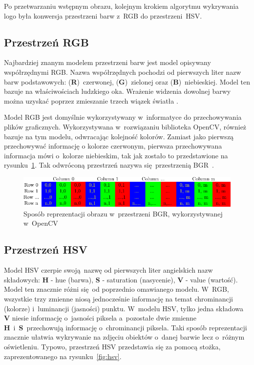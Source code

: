 Po przetwarzaniu wstępnym obrazu, kolejnym krokiem algorytmu wykrywania logo \bk była konwersja przestrzeni barw z~RGB do przestrzeni~HSV.

\subsection{Przestrzeń RGB}
Najbardziej znanym modelem przestrzeni barw jest model opisywany współrzędnymi RGB. Nazwa współrzędnych pochodzi od pierwszych liter nazw barw podstawowych: (\textbf{R})~czerwonej, (\textbf{G})~zielonej oraz (\textbf{B})~niebieskiej. Model ten bazuje na właściwościach ludzkiego oka. Wrażenie widzenia dowolnej barwy można uzyskać poprzez zmieszanie trzech wiązek światła \cite{jankowski1990elementy}.

Model RGB jest domyślnie wykorzystywany w~informatyce do przechowywania plików graficznych. Wykorzystywana w~rozwiązaniu biblioteka OpenCV, również bazuje na tym modelu, odwracając kolejność kolorów. Zamiast jako pierwszą przechowywać informację o kolorze czerwonym, pierwsza przechowywana informacja mówi o~kolorze niebieskim, tak jak zostało to przedstawione na rysunku~\ref{fig:bgr}. Tak odwróconą przestrzeń nazywa się przestrzenią BGR~\cite{opencv}.

\begin{figure}[h]
    \centering
    \includegraphics[width=\columnwidth]{./figures/opencv-matrix-bgr.png}
    \caption{Sposób reprezentacji obrazu w~przestrzeni BGR, wykorzystywanej w~OpenCV~\cite{opencv}}
    \label{fig:bgr}
\end{figure}

\subsection{Przestrzeń HSV}
Model HSV czerpie swoją nazwę od pierwszych liter angielskich nazw składowych: \textbf{H} - hue (barwa), \textbf{S} - saturation (nasycenie), \textbf{V} - value (wartość). Model ten znacznie różni się od poprzednio omawianego modelu. W~RGB, wszystkie trzy zmienne niosą jednocześnie informację na temat chrominancji (kolorze) i~luminancji (jasności) punktu. W~modelu HSV, tylko jedna składowa \textbf{V} niesie informację o~jasności piksela a~pozostałe dwie zmienne \textbf{H}~i~\textbf{S}~przechowują informację o~chrominancji piksela. Taki sposób reprezentacji znacznie ułatwia wykrywanie na zdjęciu obiektów o~danej barwie lecz o~różnym oświetleniu. Typowo, przestrzeń HSV przedstawia się za pomocą stożka, zaprezentowanego na rysunku~\ref{fig:hsv}.

